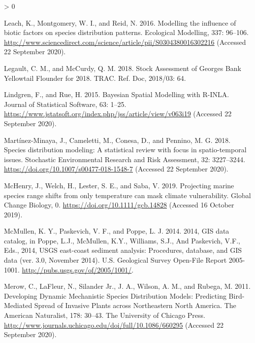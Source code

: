 \documentclass[
]{article}
\newlength{\cslhangindent}
\newenvironment{CSLReferences}[2] %
 {%
  \setlength{\parindent}{0pt}
  \ifodd #1 \everypar{\setlength{\hangindent}{\cslhangindent}}\ignorespaces\fi
  \ifnum #2 > 0
  \setlength{\parskip}{#2\baselineskip}
  \fi
 }%
 {}
\begin{document}
\begin{CSLReferences}{1}{0}
\leavevmode\hypertarget{ref-leachModellingInfluenceBiotic2016}{}%
Leach, K., Montgomery, W. I., and Reid, N. 2016. Modelling the influence of biotic factors on species distribution patterns. Ecological Modelling, 337: 96--106. \url{http://www.sciencedirect.com/science/article/pii/S0304380016302216} (Accessed 22 September 2020).

\leavevmode\hypertarget{ref-legaultStockAssessmentGeorges2018}{}%
Legault, C. M., and McCurdy, Q. M. 2018. Stock {Assessment} of {Georges Bank Yellowtail Flounder} for 2018. TRAC. Ref. Doc, 2018/03: 64.

\leavevmode\hypertarget{ref-lindgrenBayesianSpatialModelling2015}{}%
Lindgren, F., and Rue, H. 2015. Bayesian {Spatial Modelling} with {R}-{INLA}. Journal of Statistical Software, 63: 1--25. \url{https://www.jstatsoft.org/index.php/jss/article/view/v063i19} (Accessed 22 September 2020).

\leavevmode\hypertarget{ref-martinez-minayaSpeciesDistributionModeling2018}{}%
Martínez-Minaya, J., Cameletti, M., Conesa, D., and Pennino, M. G. 2018. Species distribution modeling: A statistical review with focus in spatio-temporal issues. Stochastic Environmental Research and Risk Assessment, 32: 3227--3244. \url{https://doi.org/10.1007/s00477-018-1548-7} (Accessed 22 September 2020).

\leavevmode\hypertarget{ref-mchenryProjectingMarineSpecies2019}{}%
McHenry, J., Welch, H., Lester, S. E., and Saba, V. 2019. Projecting marine species range shifts from only temperature can mask climate vulnerability. Global Change Biology, 0. \url{https://doi.org/10.1111/gcb.14828} (Accessed 16 October 2019).

\leavevmode\hypertarget{ref-mcmullen2014GISData2014}{}%
McMullen, K. Y., Paskevich, V. F., and Poppe, L. J. 2014. 2014, {GIS} data catalog, in {Poppe}, {L}.{J}., {McMullen}, {K}.{Y}., {Williams}, {S}.{J}., And {Paskevich}, {V}.{F}., Eds., 2014, {USGS} east-coast sediment analysis: {Procedures}, database, and {GIS} data (ver. 3.0, {November} 2014). U.S. Geological Survey Open-File Report 2005-1001. \url{http://pubs.usgs.gov/of/2005/1001/}.

\leavevmode\hypertarget{ref-merowDevelopingDynamicMechanistic2011}{}%
Merow, C., LaFleur, N., Silander Jr., J. A., Wilson, A. M., and Rubega, M. 2011. Developing {Dynamic Mechanistic Species Distribution Models}: {Predicting Bird}-{Mediated Spread} of {Invasive Plants} across {Northeastern North America}. The American Naturalist, 178: 30--43. {The University of Chicago Press}. \url{http://www.journals.uchicago.edu/doi/full/10.1086/660295} (Accessed 22 September 2020).


\end{CSLReferences}
\end{document}
